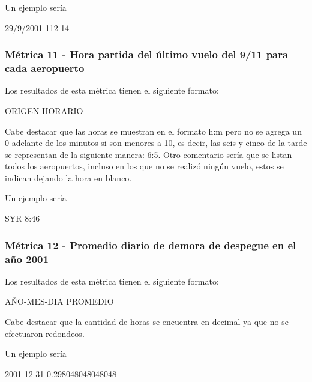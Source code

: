 \documentclass[a4paper,10pt]{article}
\begin{document}
            Un ejemplo sería\\
            \begin{center}
                29/9/2001  112  14\\
            \end{center}

       \subsubsection{Métrica 11 - Hora partida del último vuelo del 9/11 para cada aeropuerto}
            Los resultados de esta métrica tienen el siguiente formato:\\
            \begin{center}
                ORIGEN HORARIO
            \end{center}
            Cabe destacar que las horas se muestran en el formato h:m pero no se agrega un 0 adelante de los minutos si son menores a 10, es decir,
            las seis y cinco de la tarde se representan de la siguiente manera: 6:5. Otro comentario sería que se listan todos los aeropuertos, incluso
            en los que no se realizó ningún vuelo, estos se indican dejando la hora en blanco.

            Un ejemplo sería\\
            \begin{center}
                SYR  8:46\\
            \end{center}

        \subsubsection{Métrica 12 - Promedio diario de demora de despegue en el año 2001}
            Los resultados de esta métrica tienen el siguiente formato:\\
            \begin{center}
                AÑO-MES-DIA PROMEDIO
            \end{center}
            Cabe destacar que la cantidad de horas se encuentra en decimal ya que no se efectuaron redondeos.

            Un ejemplo sería\\
            \begin{center}
                2001-12-31  0.298048048048048\\
            \end{center}
\end{document}
